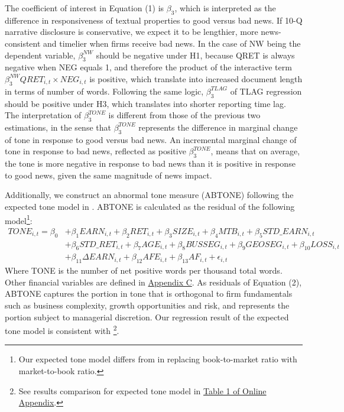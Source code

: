 \documentclass[a4paper]{article}
\begin{document}
\begin{spacing}{2}
The coefficient of interest in Equation (1) is $\beta_3$, which is interpreted as the difference in responsiveness of textual properties to good versus bad news. If 10-Q narrative disclosure is conservative, we expect it to be lengthier, more news-consistent and timelier when firms receive bad news. In the case of NW being the dependent variable, $\beta_3^{NW}$ should be negative under H1, because QRET is always negative when NEG equals 1, and therefore the product of the interactive term $\beta_3^{NW}QRET_{i,t}\times NEG_{i,t}$ is positive, which translate into increased document length in terms of number of words. Following the same logic, $\beta_3^{TLAG}$ of TLAG regression should be positive under H3, which translates into shorter reporting time lag. The interpretation of $\beta_3^{TONE}$ is different from those of the previous two estimations, in the sense that $\beta_3^{TONE}$ represents the difference in marginal change of tone in response to good versus bad news. An incremental marginal change of tone in response to bad news, reflected as positive $\beta_3^{TONE}$, means that on average, the tone is more negative in response to bad news than it is positive in response to good news, given the same magnitude of news impact.

Additionally, we construct an abnormal tone measure (ABTONE) following the expected tone model in \citet{huangToneManagement2014}. ABTONE is calculated as the residual of the following model\footnote{Our expected tone model differs from \citet{huangToneManagement2014} in replacing book-to-market ratio with market-to-book ratio.}:
\begin{equation} \label{eq2}
\begin{split}
TONE_{i,t}=\beta_0&+\beta_1EARN_{i,t}+\beta_2RET_{i,t}+\beta_3SIZE_{i,t}+\beta_4MTB_{i,t}+\beta_5STD\_EARN_{i,t}\\
&+\beta_6STD\_RET_{i,t}+\beta_7AGE_{i,t}+\beta_8BUSSEG_{i,t}+\beta_9GEOSEG_{i,t}+\beta_{10}LOSS_{i,t}\\
&+\beta_{11}\Delta EARN_{i,t}+\beta_{12}AFE_{i,t}+\beta_{13}AF_{i,t}+\epsilon_{i,t}
\end{split}
\end{equation}
Where TONE is the number of net positive words per thousand total words. Other financial variables are defined in \hyperref[appc]{Appendix C}. As residuals of Equation (2), ABTONE captures the portion in tone that is orthogonal to firm fundamentals such as business complexity, growth opportunities and risk, and represents the portion subject to managerial discretion. Our regression result of the expected tone model is consistent with \citet{huangToneManagement2014}\footnote{See results comparison for expected tone model in \hyperref[oat1]{Table 1 of Online Appendix}.}.


\end{spacing}
\end{document}
